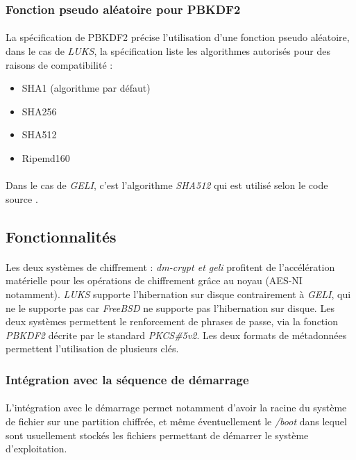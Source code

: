 \subsubsection{Fonction pseudo aléatoire pour PBKDF2}
\paragraph{}
La spécification de PBKDF2 \cite{PKCS5v2} précise l'utilisation d'une fonction
pseudo aléatoire, dans le cas de {\em LUKS}, la spécification 
\cite{onDiskFormatLuks} liste les algorithmes autorisés
pour des raisons de compatibilité :
\begin{itemize}
	\item SHA1 (algorithme par défaut)
	\item SHA256
	\item SHA512
	\item Ripemd160
\end{itemize}
\paragraph{}
Dans le cas de {\em GELI}, c'est l'algorithme {\em SHA512} qui est utilisé
selon le code source \cite{geliPkcs5v2.c}.
\subsection{Fonctionnalités}
\paragraph{}
Les deux systèmes de chiffrement : {\em dm-crypt \em et \em geli} profitent 
de l'accélération matérielle pour les opérations de chiffrement grâce au 
noyau (AES-NI notamment). {\em LUKS} supporte l'hibernation sur disque 
contrairement à {\em GELI}, qui ne le supporte pas car {\em FreeBSD} ne 
supporte pas l'hibernation sur disque. Les deux systèmes permettent le 
renforcement de phrases de passe, via la fonction {\em PBKDF2} décrite 
par le standard {\em PKCS\#5v2}. Les deux formats de métadonnées 
permettent l'utilisation de plusieurs clés.

\subsubsection{Intégration avec la séquence de démarrage}
\paragraph{}
L'intégration avec le démarrage permet notamment d'avoir la racine du système 
de fichier sur une partition chiffrée, et même éventuellement le {\em /boot}
dans lequel sont usuellement stockés les fichiers permettant de démarrer le 
système d'exploitation.

